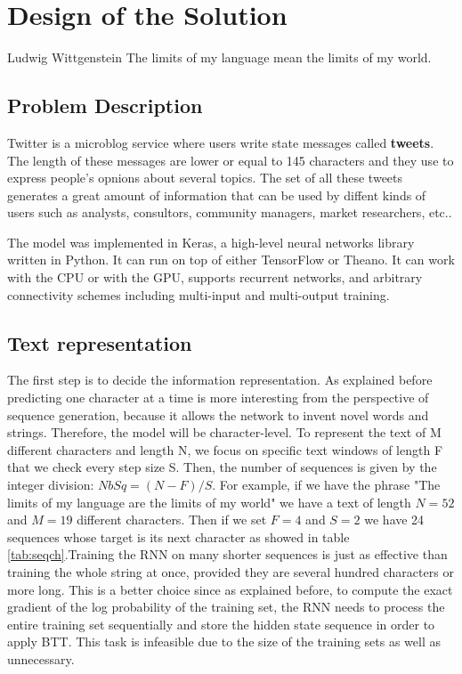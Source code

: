 \chapter{Design of the Solution}
\label{ch:design}

\begin{chapterquote}{Ludwig Wittgenstein}
	The limits of my language mean the limits of my world.
\end{chapterquote}

\section{Problem Description}

Twitter is a microblog service where users write state messages called \textbf{tweets}. The length of these messages are lower or equal to 145 characters and they use to express people's opnions about several topics. The set of all these tweets generates a great amount of information that can be used by diffent kinds of users such as analysts, consultors, community managers, market researchers, etc..

The model was implemented in Keras, a high-level neural networks library written in Python. It can run on top of either TensorFlow or Theano. It can work with the CPU or with the GPU, supports recurrent networks, and arbitrary connectivity schemes including multi-input and multi-output training. 

\section{Text representation}

The first step is to decide the information representation. As explained before predicting one character at a time is more interesting from the perspective of sequence generation, because it allows the network to invent novel words and strings. Therefore, the model will be character-level. To represent the text of M different characters and length N, we focus on specific text windows of length F that we check every step size S. Then, the number of sequences is given by the integer division: $NbSq=(N-F)/S$. For example, if we have the phrase "The limits of my language are the limits of my world" we have a text of length $N=52$ and $M=19$ different characters. Then if we set $F=4$ and $S=2$ we have 24 sequences whose target is its next character as showed in table \ref{tab:seqch}.Training the RNN on many shorter sequences is just as effective than training the whole string at once, provided they are several hundred characters or more long. This is a better choice since as explained before, to compute the exact gradient of the log probability of the training set, the RNN needs to process the entire training set sequentially and store the hidden state sequence in order to apply BTT. This task is infeasible due to the size of the training sets as well as unnecessary\cite{sutskever2011generating}.

